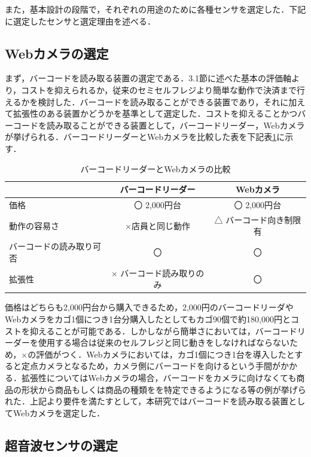 また，基本設計の段階で，それぞれの用途のために各種センサを選定した．下記に選定したセンサと選定理由を述べる．


\subsection{Webカメラの選定}


まず，バーコードを読み取る装置の選定である．3.1節に述べた基本の評価軸より，コストを抑えられるか，従来のセミセルフレジより簡単な動作で決済まで行えるかを検討した．バーコードを読み取ることができる装置であり，それに加えて拡張性のある装置かどうかを基準として選定した．コストを抑えることかつバーコードを読み取ることができる装置として，バーコードリーダー，Webカメラが挙げられる．バーコードリーダーとWebカメラを比較した表を下記表\ref{came}に示す．


\begin{table}[htb]
\begin{center}
\caption{バーコードリーダーとWebカメラの比較}
\begin{tabular}{|l|c|c|} \hline
 & バーコードリーダー & Webカメラ \\ \hline \hline
価格 & 〇 2,000円台 & 〇 2,000円台 \\
動作の容易さ & ×店員と同じ動作 & △ バーコード向き制限有 \\
バーコードの読み取り可否 & 〇 & 〇 \\
拡張性 & × バーコード読み取りのみ & 〇 \\ \hline
\end{tabular}
\label{came}
\end{center}
\end{table}


価格はどちらも2,000円台から購入できるため，2,000円のバーコードリーダやWebカメラをカゴ1個につき1台分購入したとしてもカゴ90個で約180,000円とコストを抑えることが可能である．しかしながら簡単さにおいては，バーコードリーダーを使用する場合は従来のセルフレジと同じ動きをしなければならないため，×の評価がつく．Webカメラにおいては，カゴ1個につき1台を導入したとすると定点カメラとなるため，カメラ側にバーコードを向けるという手間がかかる．拡張性についてはWebカメラの場合，バーコードをカメラに向けなくても商品の形状から商品もしくは商品の種類をを特定できるようになる等の例が挙げられた．上記より要件を満たすとして，本研究ではバーコードを読み取る装置としてWebカメラを選定した．


\subsection{超音波センサの選定}


